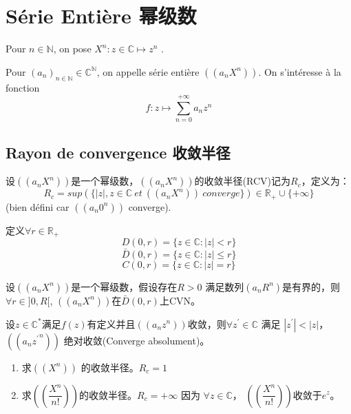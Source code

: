 \documentclass[math_note.tex]{subfiles}
\begin{document}
\chapter{Série Entière 幂级数}
\begin{note}
	Pour $n \in \mathbb{N}$, on pose $X^{n}:z \in \mathbb{C} \mapsto z^{n}$ .
\end{note}
\begin{newdef}
	Pour $(a_{n})_{n\in \mathbb{N}} \in \mathbb{C}^{\mathbb{N}}$, on 
	appelle série entière $((a_{n}X^{n}))$. On s'intéresse à la fonction 
	$$f : z \mapsto \sum_{n=0}^{+\infty} a_{n} z^{n}$$
\end{newdef}

\section{Rayon de convergence 收敛半径}
\begin{newdef}
	设$((a_{n}X^{n}))$是一个幂级数，$((a_{n}X^{n}))$的收敛半径(RCV)记为$R_{c}$，定义为：
	$$R_{c} = sup(\{|z|,z \in \mathbb{C} ~ et ~ ((a_{n}X^{n})) ~ converge\}) \in 
	\mathbb{R}_{+} \cup \{ + \infty\}$$ (bien défini car $((a_{n}0^{n}))$ converge).
\end{newdef}

\begin{note}
		定义$\forall r \in \mathbb{R}_{+}$
		$$D(0,r)=\{ z \in \mathbb{C} : |z| < r \}$$
		$$\bar{D}(0,r)=\{ z \in \mathbb{C} : |z| \leq r \}$$
		$$C(0,r)=\{ z \in \mathbb{C} : |z| = r \}$$
\end{note}

\begin{newlemma}[d'Abel]
设$((a_{n}X^{n}))$是一个幂级数，假设存在$R > 0$ 满足数列$(a_{n}R^{n})$是有界的，则$\forall 
r \in ]0,R[$, $((a_{n}X^{n}))$在$\bar{D}(0,r)$上CVN。
\end{newlemma}

\begin{newproof}
	
\end{newproof}

\begin{conclusion}
	设$z\in \mathbb{C}^{*}$满足$f(z)$有定义并且$((a_{n}z^{n}))$收敛，则$\forall z^{'} \in 
	\mathbb{C}$ 满足 $|z^{'}| < |z|$， $((a_{n}{z^{'}}^{n}))$ 绝对收敛(Converge absolument)。
\end{conclusion}

\begin{example}
	\begin{enumerate}
		\item 求$((X^{n}))$ 的收敛半径。$R_{c}=1$ 
		\item 求$((\dfrac{X^{n}}{n!}))$的收敛半径。$R_{c}=+\infty$ 因为 $\forall z \in 
		\mathbb{C}$， $((\dfrac{X^{n}}{n!}))$收敛于$e^{z}$。
	\end{enumerate}
\end{example}
\end{document}
